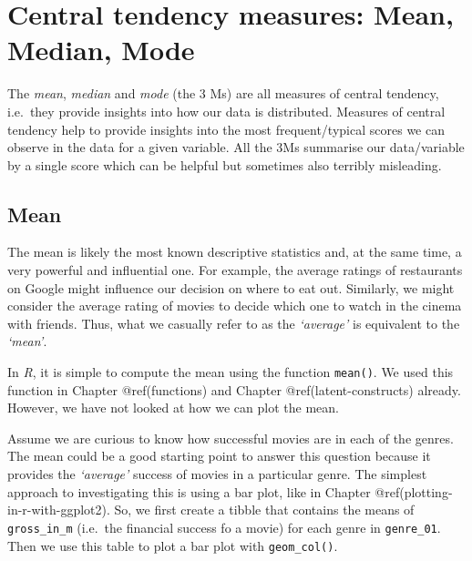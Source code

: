 \documentclass[
  letterpaper,
]{krantz}
\begin{document}
\section{Central tendency measures: Mean, Median,
Mode}\label{sec-central-tendency}

The \emph{mean}, \emph{median} and \emph{mode} (the 3 Ms) are all
measures of central tendency, i.e.~they provide insights into how our
data is distributed. Measures of central tendency help to provide
insights into the most frequent/typical scores we can observe in the
data for a given variable. All the 3Ms summarise our data/variable by a
single score which can be helpful but sometimes also terribly
misleading.

\subsection{Mean}\label{mean}

The mean is likely the most known descriptive statistics and, at the
same time, a very powerful and influential one. For example, the average
ratings of restaurants on Google might influence our decision on where
to eat out. Similarly, we might consider the average rating of movies to
decide which one to watch in the cinema with friends. Thus, what we
casually refer to as the \emph{`average'} is equivalent to the
\emph{`mean'}.

In \emph{R}, it is simple to compute the mean using the function
\texttt{mean()}. We used this function in Chapter @ref(functions) and
Chapter @ref(latent-constructs) already. However, we have not looked at
how we can plot the mean.

Assume we are curious to know how successful movies are in each of the
genres. The mean could be a good starting point to answer this question
because it provides the \emph{`average'} success of movies in a
particular genre. The simplest approach to investigating this is using a
bar plot, like in Chapter @ref(plotting-in-r-with-ggplot2). So, we first
create a tibble that contains the means of \texttt{gross\_in\_m}
(i.e.~the financial success fo a movie) for each genre in
\texttt{genre\_01}. Then we use this table to plot a bar plot with
\texttt{geom\_col()}.
\end{document}
